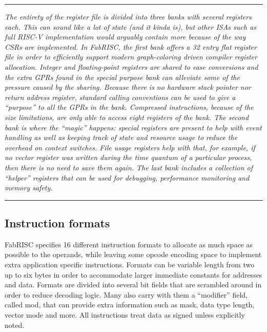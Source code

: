         \par\noindent\rule{\textwidth}{0.4pt}
        \textit{The entirety of the register file is divided into three banks with several registers each. This can sound like a lot of state (and it kinda is), but other ISAs such as full RISC-V implementation would arguably contain more because of the way CSRs are implemented. In FabRISC, the first bank offers a 32 entry flat register file in order to efficiently support modern graph-coloring driven compiler register allocation. Integer and floating-point registers are shared to ease conversions and the extra GPRs found in the special purpose bank can alleviate some of the pressure caused by the sharing. Because there is no hardware stack pointer nor return address register, standard calling conventions can be used to give a ``purpose'' to all the GPRs in the bank. Compressed instructions, because of the size limitations, are only able to access eight registers of the bank. The second bank is where the ``magic'' happens: special registers are present to help with event handling as well as keeping track of state and resource usage to reduce the overhead on context switches. File usage registers help with that, for example, if no vector register was written during the time quantum of a particular process, then there is no need to save them again. The last bank includes a collection of ``helper'' registers that can be used for debugging, performance monitoring and memory safety.}
        \par\noindent\rule{\textwidth}{0.4pt}

        \subsection{Instruction formats}

            \vspace{10pt}

            FabRISC specifies 16 different instruction formats to allocate as much space as possible to the operands, while leaving some opcode encoding space to implement extra application specific instructions. Formats can be variable length from two up to six bytes in order to accommodate larger immediate constants for addresses and data. Formats are divided into several bit fields that are scrambled around in order to reduce decoding logic. Many also carry with them a ``modifier'' field, called mod, that can provide extra information such as mask, data type length, vector mode and more. All instructions treat data as signed unless explicitly noted.

